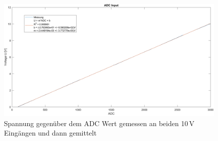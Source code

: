 \begin{figure}[h!]
	\centering
	\includegraphics[width=1\textwidth]{graphics/ADC_Input_Kurve.png}
	\caption{Spannung gegenüber dem ADC Wert gemessen an beiden 10\,V Eingängen und dann gemittelt}
	\label{pic: /ADC_Input_Kurve}
\end{figure}
\newpage
